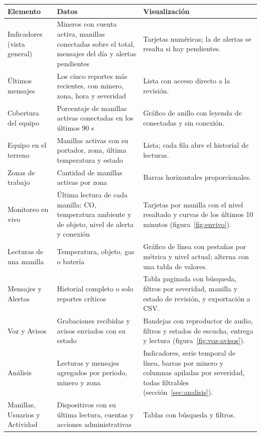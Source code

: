 \documentclass[10pt,a4paper]{article}
\begin{document}
\label{tab:vistas}
\begin{tabularx}{\linewidth}{@{}P{30mm}P{58mm}Y@{}}
\toprule\textbf{Elemento} & \textbf{Datos} & \textbf{Visualización}\\\midrule
Indicadores (vista general) & Mineros con cuenta activa, manillas conectadas sobre el total, mensajes del día y alertas pendientes & Tarjetas numéricas; la de alertas se resalta si hay pendientes.\\
Últimos mensajes & Los cinco reportes más recientes, con minero, zona, hora y severidad & Lista con acceso directo a la revisión.\\
Cobertura del equipo & Porcentaje de manillas activas conectadas en los últimos 90 s & Gráfico de anillo con leyenda de conectadas y sin conexión.\\
Equipo en el terreno & Manillas activas con su portador, zona, última temperatura y estado & Lista; cada fila abre el historial de lecturas.\\
Zonas de trabajo & Cantidad de manillas activas por zona & Barras horizontales proporcionales.\\
Monitoreo en vivo & Última lectura de cada manilla: CO, temperatura ambiente y de objeto, nivel de alerta y conexión & Tarjetas por manilla con el nivel resaltado y curvas de los últimos 10 minutos (figura~\ref{fig:envivo}).\\
Lecturas de una manilla & Temperatura, objeto, gas o batería & Gráfico de línea con pestañas por métrica y nivel actual; alterna con una tabla de valores.\\
Mensajes y Alertas & Historial completo o solo reportes críticos & Tabla paginada con búsqueda, filtros por severidad, manilla y estado de revisión, y exportación a CSV.\\
Voz y Avisos & Grabaciones recibidas y avisos enviados con su estado & Bandejas con reproductor de audio, filtros y estados de escucha, entrega y lectura (figura~\ref{fig:voz-avisos}).\\
Análisis & Lecturas y mensajes agregados por periodo, minero y zona & Indicadores, serie temporal de línea, barras por minero y columnas apiladas por severidad, todas filtrables (sección~\ref{sec:analisis}).\\
Manillas, Usuarios y Actividad & Dispositivos con su última lectura, cuentas y acciones administrativas & Tablas con búsqueda y filtros.\\\bottomrule
\end{tabularx}
\end{document}
